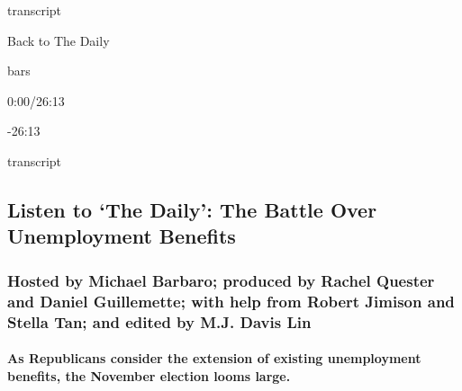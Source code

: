 transcript

Back to The Daily

bars

0:00/26:13

-26:13

transcript

\hypertarget{listen-to-the-daily-the-battle-over-unemployment-benefits-1}{%
\subsection{Listen to `The Daily': The Battle Over Unemployment
Benefits}\label{listen-to-the-daily-the-battle-over-unemployment-benefits-1}}

\hypertarget{hosted-by-michael-barbaro-produced-by-rachel-quester-and-daniel-guillemette-with-help-from-robert-jimison-and-stella-tan-and-edited-by-mj-davis-lin}{%
\subsubsection{Hosted by Michael Barbaro; produced by Rachel Quester and
Daniel Guillemette; with help from Robert Jimison and Stella Tan; and
edited by M.J. Davis
Lin}\label{hosted-by-michael-barbaro-produced-by-rachel-quester-and-daniel-guillemette-with-help-from-robert-jimison-and-stella-tan-and-edited-by-mj-davis-lin}}

\hypertarget{as-republicans-consider-the-extension-of-existing-unemployment-benefits-the-november-election-looms-large}{%
\paragraph{As Republicans consider the extension of existing
unemployment benefits, the November election looms
large.}\label{as-republicans-consider-the-extension-of-existing-unemployment-benefits-the-november-election-looms-large}}

